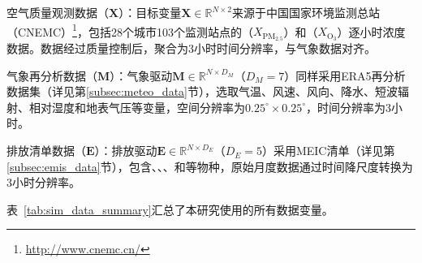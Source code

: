 空气质量观测数据（$\mathbf{X}$）：目标变量$\mathbf{X} \in \mathbb{R}^{N \times 2}$来源于中国国家环境监测总站（CNEMC）\footnote{\url{http://www.cnemc.cn/}}，包括28个城市103个监测站点的\PM（$X_{\text{PM}_{2.5}}$）和\ozone（$X_{\text{O}_3}$）逐小时浓度数据。数据经过质量控制后，聚合为3小时时间分辨率，与气象数据对齐。

气象再分析数据（$\mathbf{M}$）：气象驱动$\mathbf{M} \in \mathbb{R}^{N \times D_M}$（$D_M=7$）同样采用ERA5再分析数据集\citep{hersbach2020era5}（详见第\ref{subsec:meteo_data}节），选取气温、风速、风向、降水、短波辐射、相对湿度和地表气压等变量，空间分辨率为$0.25^{\circ} \times 0.25^{\circ}$，时间分辨率为3小时。

排放清单数据（$\mathbf{E}$）：排放驱动$\mathbf{E} \in \mathbb{R}^{N \times D_E}$（$D_E=5$）采用MEIC清单\citep{zheng2018trends}（详见第\ref{subsec:emis_data}节），包含\PM、\PMten、\SOtwo、\NOx 和\VOCs 等物种，原始月度数据通过时间降尺度转换为3小时分辨率。

表~\ref{tab:sim_data_summary}汇总了本研究使用的所有数据变量。

